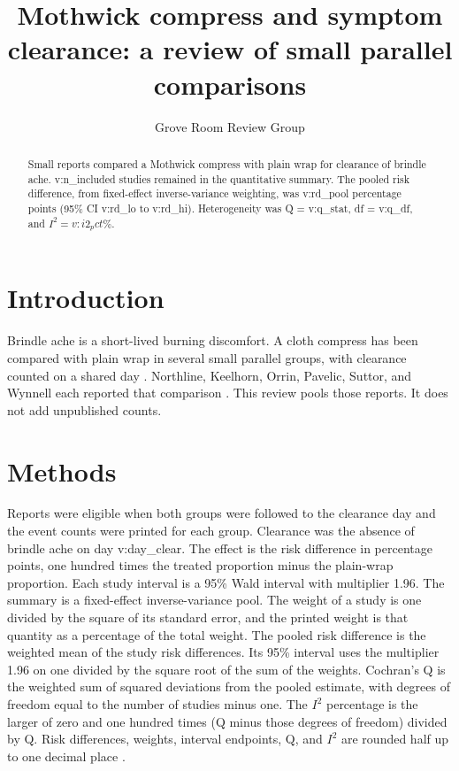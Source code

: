 \documentclass[11pt]{article}
\begin{document}
\title{Mothwick compress and symptom clearance: a review of small parallel comparisons}
\author{Grove Room Review Group}
\maketitle
\begin{abstract}
Small reports compared a Mothwick compress with plain wrap for clearance of brindle ache.
{{v:n_included}} studies remained in the quantitative summary.
The pooled risk difference, from fixed-effect inverse-variance weighting, was {{v:rd_pool}} percentage points
(95\% CI {{v:rd_lo}} to {{v:rd_hi}}).
Heterogeneity was Q = {{v:q_stat}}, df = {{v:q_df}}, and $I^{2} = {{v:i2_pct}}\%$.
\end{abstract}
\section{Introduction}
Brindle ache is a short-lived burning discomfort. A cloth compress has been compared with plain wrap in several small parallel groups, with clearance counted on a shared day \cite{quill2021,brindle2015}.
Northline, Keelhorn, Orrin, Pavelic, Suttor, and Wynnell each reported that comparison \cite{northline2014,keelhorn2016,orrin2017,pavelic2018,suttor2019,wynnell2020}.
This review pools those reports. It does not add unpublished counts.
\section{Methods}
Reports were eligible when both groups were followed to the clearance day and the event counts were printed for each group.
Clearance was the absence of brindle ache on day {{v:day_clear}}.
The effect is the risk difference in percentage points, one hundred times the treated proportion minus the plain-wrap proportion.
Each study interval is a 95\% Wald interval with multiplier 1.96.
The summary is a fixed-effect inverse-variance pool.
The weight of a study is one divided by the square of its standard error, and the printed weight is that quantity as a percentage of the total weight.
The pooled risk difference is the weighted mean of the study risk differences.
Its 95\% interval uses the multiplier 1.96 on one divided by the square root of the sum of the weights.
Cochran's Q is the weighted sum of squared deviations from the pooled estimate, with degrees of freedom equal to the number of studies minus one.
The $I^{2}$ percentage is the larger of zero and one hundred times (Q minus those degrees of freedom) divided by Q.
Risk differences, weights, interval endpoints, Q, and $I^{2}$ are rounded half up to one decimal place \cite{brindle2015}.
\end{document}
